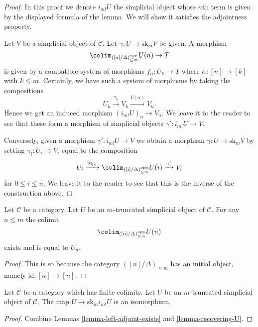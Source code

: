\begin{proof}
In this proof we denote $i_{m!}U$ the simplicial object
whose $n$th term is given by the displayed formula of the
lemma. We will show it satisfies the adjointness property.

\medskip\noindent
Let $V$ be a simplicial object of $\mathcal{C}$.
Let $\gamma : U \to \text{sk}_mV$ be given.
A morphism
$$
\colim_{([n]/\Delta)_{\leq m}^{opp}} U(n) \to T
$$
is given by a compatible system of morphisms
$f_\alpha : U_k \to T$ where $\alpha : [n] \to [k]$
with $k \leq m$. Certainly, we have such a system of
morphisms by taking the compositions
$$
U_k \xrightarrow{\gamma_k} V_k \xrightarrow{V(\alpha)} V_n.
$$
Hence we get an induced morphism $(i_{m!}U)_n \to V_n$.
We leave it to the reader to see that these form a
morphism of simplicial objects $\gamma' : i_{m!}U \to V$.

\medskip\noindent
Conversely, given a morphism $\gamma' : i_{m!}U \to V$ we obtain
a morphism $\gamma : U \to \text{sk}_m V$ by setting
$\gamma_i : U_i \to V_i$ equal to the composition
$$
U_i
\xrightarrow{\text{id}_{[i]}}
\colim_{([i]/\Delta)_{\leq m}^{opp}} U(i)
\xrightarrow{\gamma'_i}
V_i
$$
for $0 \leq i \leq n$. We leave it to the reader to see that
this is the inverse of the construction above.
\end{proof}

\begin{lemma}
\label{lemma-recovering-U}
Let $\mathcal{C}$ be a category.
Let $U$ be an $m$-truncated simplicial object of $\mathcal{C}$.
For any $n \leq m$ the colimit
$$
\colim_{([n]/\Delta)_{\leq m}^{opp}} U(n)
$$
exists and is equal to $U_n$.
\end{lemma}

\begin{proof}
This is so because the category $([n]/\Delta)_{\leq m}$
has an initial object, namely $\text{id} : [n] \to [n]$.
\end{proof}

\begin{lemma}
\label{lemma-recovering-U-for-real}
Let $\mathcal{C}$ be a category which has finite colimits.
Let $U$ be an $m$-truncated simplicial object of $\mathcal{C}$.
The map $U \to \text{sk}_m i_{m!}U$ is an isomorphism.
\end{lemma}

\begin{proof}
Combine Lemmas \ref{lemma-left-adjoint-exists} and \ref{lemma-recovering-U}.
\end{proof}

